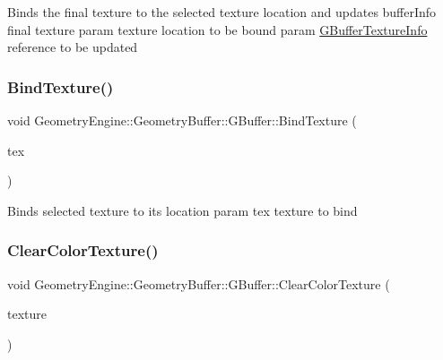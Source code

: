 Binds the final texture to the selected texture location and updates buffer\+Info final texture param texture location to be bound param \mbox{\hyperlink{struct_geometry_engine_1_1_g_buffer_texture_info}{G\+Buffer\+Texture\+Info}} reference to be updated \mbox{\label{class_geometry_engine_1_1_geometry_buffer_1_1_g_buffer_a6a2469afe0c79b97d35ba5d2b6a1ae52}} 
\subsubsection{\texorpdfstring{BindTexture()}{BindTexture()}}
{\footnotesize\ttfamily void Geometry\+Engine\+::\+Geometry\+Buffer\+::\+G\+Buffer\+::\+Bind\+Texture (\begin{DoxyParamCaption}\item[{\mbox{\hyperlink{class_geometry_engine_1_1_geometry_buffer_1_1_g_buffer_a718dceafcac1915f7de061108597e1cc}{G\+B\+U\+F\+F\+E\+R\+\_\+\+T\+E\+X\+T\+U\+R\+E\+\_\+\+T\+Y\+PE}}}]{tex }\end{DoxyParamCaption})}

Binds selected texture to its location param tex texture to bind \mbox{\label{class_geometry_engine_1_1_geometry_buffer_1_1_g_buffer_abf39c85cb87eaf0475205b59333253c0}} 
\subsubsection{\texorpdfstring{ClearColorTexture()}{ClearColorTexture()}}
{\footnotesize\ttfamily void Geometry\+Engine\+::\+Geometry\+Buffer\+::\+G\+Buffer\+::\+Clear\+Color\+Texture (\begin{DoxyParamCaption}\item[{\mbox{\hyperlink{class_geometry_engine_1_1_geometry_buffer_1_1_g_buffer_a718dceafcac1915f7de061108597e1cc}{G\+B\+U\+F\+F\+E\+R\+\_\+\+T\+E\+X\+T\+U\+R\+E\+\_\+\+T\+Y\+PE}}}]{texture }\end{DoxyParamCaption})}

